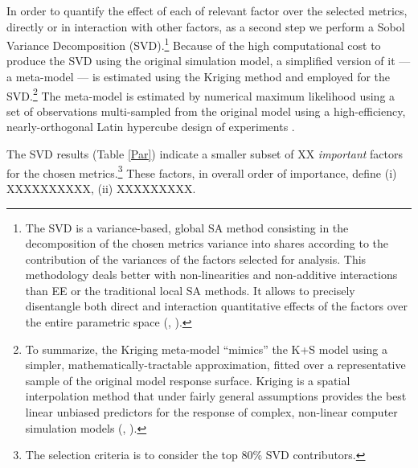 \documentclass[a4paper,11pt]{article}
\begin{document}
\begin{appendices}
In order to quantify the effect of each of relevant factor over the selected metrics, directly or in interaction with other factors, as a second step we perform a Sobol Variance Decomposition (SVD).\footnote{The SVD is a variance-based, global SA method consisting in the decomposition of the chosen metrics variance into shares according to the contribution of the variances of the factors selected for analysis. This methodology deals better with non-linearities and non-additive interactions than EE or the traditional local SA methods. It allows to precisely disentangle both direct and interaction quantitative effects of the factors over the entire parametric space (\citealp{sobol1993sensitivity}, \citealp{saltelli2008global}).} Because of the high computational cost to produce the SVD using the original simulation model, a simplified version of it — a meta-model — is estimated using the Kriging method and employed for the SVD.\footnote{To summarize, the Kriging meta-model ``mimics'' the K+S model using a simpler, mathematically-tractable approximation, fitted over a representative sample of the original model response surface. Kriging is a spatial interpolation method that under fairly general assumptions provides the best linear unbiased predictors for the response of complex, non-linear computer simulation models (\citealp{williams2006gaussian}, \citealp{salle2014efficient}).} The meta-model is estimated by numerical maximum likelihood using a set of observations multi-sampled from the original model using a high-efficiency, nearly-orthogonal Latin hypercube design of experiments \citep{cioppa2012efficient}.

The SVD results (Table \ref{Par}) indicate a smaller subset of XX \emph{important} factors for the chosen metrics.\footnote{The selection criteria is to consider the top 80\% SVD contributors.} These factors, in overall order of importance, define (i) XXXXXXXXXX, (ii) XXXXXXXXX.

\begin{landscape}


\end{landscape}
\end{appendices}
\end{document}
